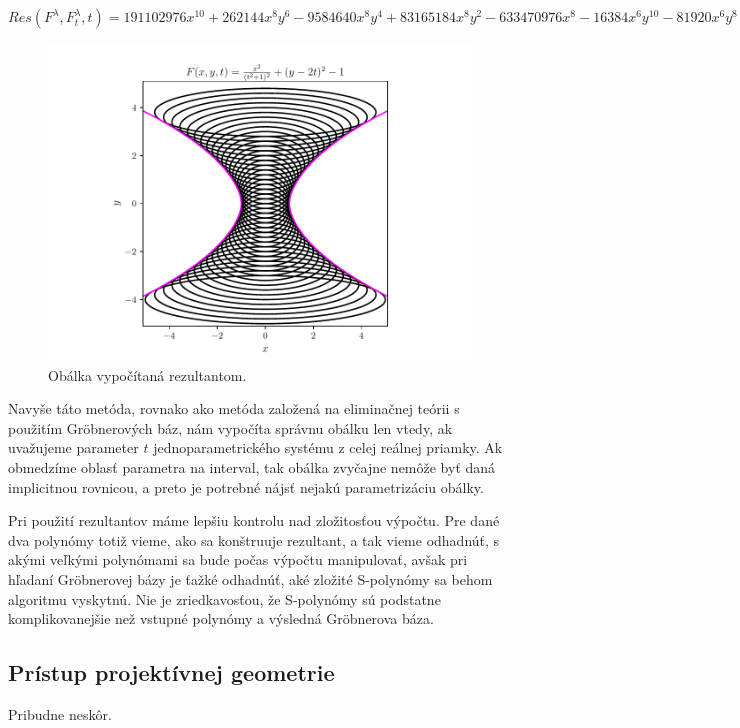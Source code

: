 $ Res(F^\lambda , F_t^\lambda , t) = 191102976x^{10} + 262144x^8y^6 - 9584640x^8y^4 + 83165184x^8y^2 - 633470976x^8 - 16384x^6y^{10} - 81920x^6y^8 - 14483456x^6y^6 - 113311744x^6y^4 + 96419840x^6y^2 + 698368000x^6 - 16384x^4y^{12} - 294912x^4y^{10} - 2998272x^4y^8 - 18284544x^4y^6 - 74956800x^4y^4 - 184320000x^4y^2 - 256000000x^4. $

\begin{figure}[H]
	\centering
	\includegraphics{images/resultant.pdf}
	\caption{Obálka vypočítaná rezultantom.}
	\label{fig:resultant}
\end{figure}

Navyše táto metóda, rovnako ako metóda založená na eliminačnej teórii s použitím Gröbnerových báz, nám vypočíta správnu obálku len vtedy, ak uvažujeme parameter $t$ jednoparametrického systému z celej reálnej priamky. Ak obmedzíme oblasť parametra na interval, tak obálka zvyčajne nemôže byť daná implicitnou rovnicou, a preto je potrebné nájsť nejakú parametrizáciu obálky. 

Pri použití rezultantov máme lepšiu kontrolu nad zložitosťou výpočtu. Pre dané dva polynómy totiž vieme, ako sa konštruuje rezultant, a tak vieme odhadnúť, s akými veľkými polynómami sa bude počas výpočtu manipulovať, avšak pri hľadaní Gröbnerovej bázy je ťažké odhadnúť, aké zložité S-polynómy sa behom algoritmu vyskytnú. Nie je zriedkavosťou, že S-polynómy sú podstatne komplikovanejšie než vstupné polynómy a výsledná Gröbnerova báza.

\subsection{Prístup projektívnej geometrie}
Pribudne neskôr.

